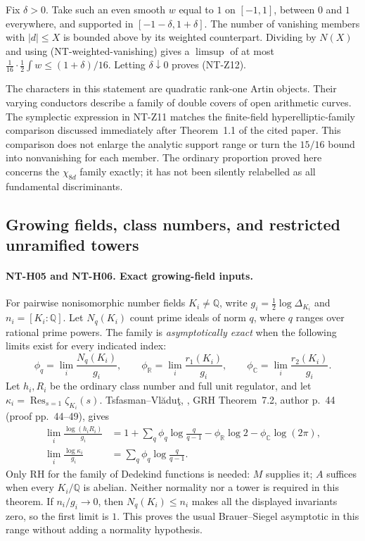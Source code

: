 \documentclass[11pt,a4paper]{article}
\begin{document}
Fix $\delta>0$.  Take such an even smooth $w$ equal to $1$ on
$[-1,1]$, between $0$ and $1$ everywhere, and supported in
$[-1-\delta,1+\delta]$.  The number of vanishing members with
$|d|\le X$ is bounded above by its weighted counterpart.  Dividing by
$N(X)$ and using (NT-weighted-vanishing) gives a $\limsup$ of at most
$\frac1{16}\cdot\frac12\int w\le(1+\delta)/16$.
Letting $\delta\downarrow0$ proves (NT-Z12).

The characters in this statement are quadratic rank-one Artin objects.
Their varying conductors describe a family of double covers of open
arithmetic curves.  The symplectic expression in NT-Z11 matches the
finite-field hyperelliptic-family comparison discussed immediately after
Theorem~1.1 of the cited paper.  This comparison does not enlarge the
analytic support range or turn the $15/16$ bound into nonvanishing for
each member.  The ordinary proportion proved here concerns the
$\chi_{8d}$ family exactly; it has not been silently relabelled as all
fundamental discriminants.

\subsection{Growing fields, class numbers, and restricted unramified towers}

\paragraph{NT-H05 and NT-H06. Exact growing-field inputs.}
For pairwise nonisomorphic number fields $K_i\ne\mathbb Q$, write
$g_i=\tfrac12\log\Delta_{K_i}$ and $n_i=[K_i:\mathbb Q]$.
Let $N_q(K_i)$ count prime ideals of norm $q$, where $q$ ranges over
rational prime powers.  The family is \emph{asymptotically exact} when
the following limits exist for every indicated index:
\[
 \phi_q=\lim_i\frac{N_q(K_i)}{g_i},\qquad
 \phi_{\mathbb R}=\lim_i\frac{r_1(K_i)}{g_i},\qquad
 \phi_{\mathbb C}=\lim_i\frac{r_2(K_i)}{g_i}.
\]
Let $h_i,R_i$ be the ordinary class number and full unit regulator, and
let $\kappa_i=\operatorname{Res}_{s=1}\zeta_{K_i}(s)$.
Tsfasman--Vl\u adu\c t, ,
GRH Theorem~7.2, author p.~44 (proof pp.~44--49), gives
\begin{align*}
 \lim_i\frac{\log(h_iR_i)}{g_i}
 &=1+\sum_q\phi_q\log\frac q{q-1}
      -\phi_{\mathbb R}\log2-\phi_{\mathbb C}\log(2\pi),\\
 \lim_i\frac{\log\kappa_i}{g_i}
 &=\sum_q\phi_q\log\frac q{q-1}.
\end{align*}
Only RH for the family of Dedekind functions is needed: $M$ supplies it;
$A$ suffices when every $K_i/\mathbb Q$ is abelian.  Neither normality
nor a tower is required in this theorem.  If $n_i/g_i\to0$, then
$N_q(K_i)\le n_i$ makes all the displayed invariants zero, so the
first limit is $1$.  This proves the usual Brauer--Siegel asymptotic
in this range without adding a normality hypothesis.
\end{document}
